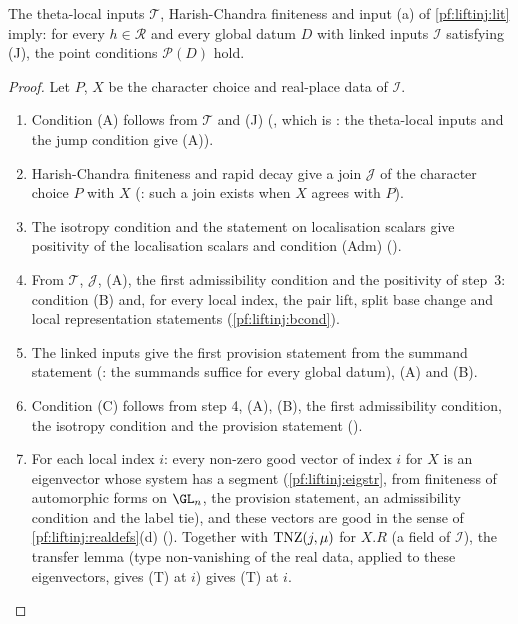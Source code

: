 \begin{theorem}\label{pf:liftinj:point}
The theta-local inputs $\mathcal T$, Harish-Chandra finiteness and input (a) of \cref{pf:liftinj:lit} imply: for every $h\in\mathcal R$ and every global
datum $D$ with linked inputs $\mathcal I$ satisfying (J), the point conditions $\mathcal P(D)$ hold.
\end{theorem}

\begin{proof}
Let $P$, $X$ be the character choice and real-place data of $\mathcal I$.
\begin{enumerate}[label=\arabic*.]
\item Condition (A) follows from $\mathcal T$ and (J) (, which is
: the theta-local inputs and the jump condition give (A)).
\item Harish-Chandra finiteness and rapid decay give a join $\mathcal J$ of the character choice $P$ with $X$
(: such a join exists when $X$ agrees with $P$).
\item The isotropy condition and the statement on localisation scalars give positivity of the localisation scalars and condition (Adm)
().
\item From $\mathcal T$, $\mathcal J$, (A), the first admissibility condition and the positivity of step~3: condition (B) and, for every local index, the
pair lift, split base change and local representation statements (\cref{pf:liftinj:bcond}).
\item The linked inputs give the first provision statement from the summand statement (: the summands
suffice for every global datum), (A) and (B).
\item Condition (C) follows from step 4, (A), (B), the first admissibility condition, the isotropy condition and the provision statement
().
\item For each local index $i$: every non-zero good vector of index $i$ for $X$ is an eigenvector whose system has a segment
(\cref{pf:liftinj:eigstr}, from finiteness of automorphic forms on $\GL_n$, the provision statement, an
admissibility condition and the label tie), and these vectors are good in the sense of \cref{pf:liftinj:realdefs}(d)
(). Together with $\mathrm{TNZ}(j,\mu)$ for $X.R$ (a field of $\mathcal I$), the
transfer lemma  (type non-vanishing of the real data, applied to these eigenvectors, gives (T)
at $i$) gives (T) at $i$.
\end{enumerate}
\end{proof}

